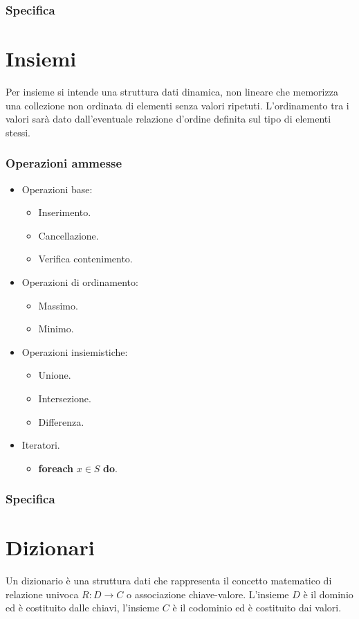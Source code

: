 \subsubsection{Specifica}

\section{Insiemi}
Per insieme si intende una struttura dati dinamica, non lineare che memorizza una collezione non ordinata di elementi senza valori ripetuti. L'ordinamento
tra i valori sar\`a dato dall'eventuale relazione d'ordine definita sul tipo di elementi stessi. 
\subsubsection{Operazioni ammesse}
\begin{itemize}
\item Operazioni base:
\begin{itemize}
\item Inserimento.
\item Cancellazione.
\item Verifica contenimento.
\end{itemize}
\item Operazioni di ordinamento:
\begin{itemize}
\item Massimo.
\item Minimo.
\end{itemize}
\item Operazioni insiemistiche:
\begin{itemize}
\item Unione.
\item Intersezione.
\item Differenza.
\end{itemize}
\item Iteratori.
\begin{itemize}
\item \textbf{foreach} $x\in S$ \textbf{do}.
\end{itemize}
\end{itemize}
\subsubsection{Specifica}

\section{Dizionari}
Un dizionario \`e una struttura dati che rappresenta il concetto matematico di relazione univoca $R:D\rightarrow C$ o associazione chiave-valore. L'insieme
$D$ \`e il dominio ed \`e costituito dalle chiavi, l'insieme $C$ \`e il codominio ed \`e costituito dai valori.
